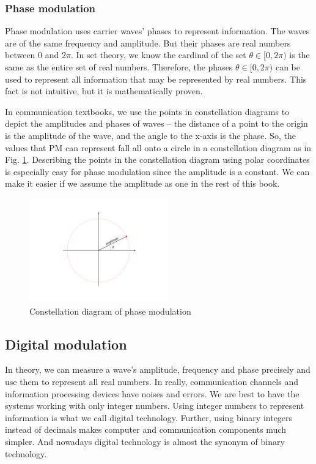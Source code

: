\documentclass{book}
\begin{document}
\subsubsection{Phase modulation}
Phase modulation uses carrier waves' phases to represent information. The waves are of the same frequency and amplitude. But their phases are real numbers between 0 and 2$\pi$. In set theory, we know the cardinal of the set $\theta \in [0, 2\pi)$ is the same as the entire set of real numbers. Therefore, the phases $\theta \in [0, 2\pi)$ can be used to represent all information that may be represented by real numbers. This fact is not intuitive, but it is mathematically proven.

In communication textbooks, we use the points in constellation diagrams to depict the amplitudes and phases of waves -- the distance of a point to the origin is the amplitude of the wave, and the angle to the x-axis is the phase. So, the values that PM can represent fall all onto a circle in a constellation diagram as in Fig. \ref{PM}. Describing the points in the constellation diagram using polar coordinates is especially easy for phase modulation since the amplitude is a constant. We can make it easier if we assume the amplitude as one in the rest of this book.

\begin{figure}[ht]
\includegraphics[width=6cm]{pic/PM.pdf}
\caption{Constellation diagram of phase modulation}
\label{PM}
\end{figure}

\subsection{Digital modulation}
In theory, we can measure a wave's amplitude, frequency and phase precisely and use them to represent all real numbers. In really, communication channels and information processing devices have noises and errors. We are best to have the systems working with only integer numbers. Using integer numbers to represent information is what we call digital technology. Further, using binary integers instead of decimals makes computer and communication components much simpler. And nowadays digital technology is almost the synonym of binary technology.
\end{document}

